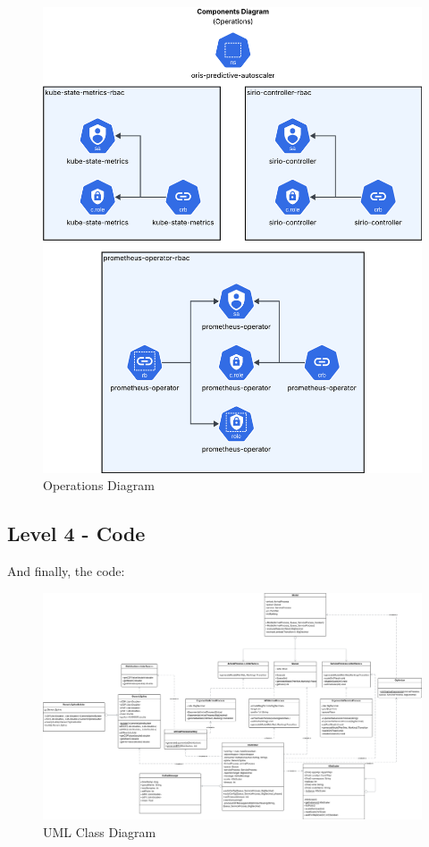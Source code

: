 \begin{figure}[ht]
    \centering
    \includegraphics[width=0.75\linewidth]{images/C4 model/componentDiagram_operations.png}
    \caption{Operations Diagram}
    \label{fig:uccomponent_diagram_operations}
\end{figure}
\newpage
\subsection{Level 4 - Code} \label{sec:code}
And finally, the code:

\begin{figure}[H]
    \centering
    \includegraphics[width=1\linewidth]{images/C4 model/UML.png}
    \caption{UML Class Diagram}
    \label{fig:uml_diagram}
\end{figure}

